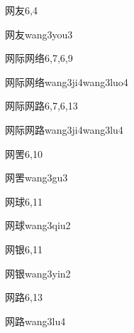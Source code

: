 \begin{entry}{网友}{6,4}
  \begin{phonetics}{网友}{wang3you3}
  \end{phonetics}
\end{entry}

\begin{entry}{网际网络}{6,7,6,9}
  \begin{phonetics}{网际网络}{wang3ji4wang3luo4}
  \end{phonetics}
\end{entry}

\begin{entry}{网际网路}{6,7,6,13}
  \begin{phonetics}{网际网路}{wang3ji4wang3lu4}
  \end{phonetics}
\end{entry}

\begin{entry}{网罟}{6,10}
  \begin{phonetics}{网罟}{wang3gu3}
  \end{phonetics}
\end{entry}

\begin{entry}{网球}{6,11}
  \begin{phonetics}{网球}{wang3qiu2}
  \end{phonetics}
\end{entry}

\begin{entry}{网银}{6,11}
  \begin{phonetics}{网银}{wang3yin2}
  \end{phonetics}
\end{entry}

\begin{entry}{网路}{6,13}
  \begin{phonetics}{网路}{wang3lu4}
  \end{phonetics}
\end{entry}

